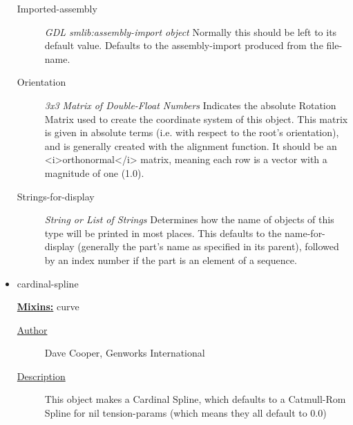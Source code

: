 \documentclass [11pt]{book}
\begin{document}
\begin{itemize}
\begin{description}
\item [Imported-assembly]
\emph{GDL smlib:assembly-import object} Normally this should be left to its default value.
Defaults to the assembly-import produced from the file-name.


\item [Orientation]
\emph{3x3 Matrix of Double-Float Numbers} Indicates the absolute Rotation Matrix used to create
the coordinate system of this object. This matrix is given in absolute terms (i.e. with
respect to the root's orientation), and is generally created with the alignment function.
It should be an <i>orthonormal</i> matrix, meaning each row is a vector with a magnitude
of one (1.0).


\item [Strings-for-display]
\emph{String or List of Strings} Determines how the name of objects of this type will be printed in most places.
This defaults to the name-for-display (generally the part's name as specified in its
parent), followed by an index number if the part is an element of a sequence.


\end{description}







\item {}cardinal-spline


\textbf{
\underline{Mixins:}} curve





\begin{description}

\item [
\underline{Author}]


Dave Cooper, Genworks International



\item [
\underline{Description}]


This object makes a Cardinal Spline, which defaults to a Catmull-Rom Spline for nil tension-params (which means they all default to 0.0)



\end{description}










\end{itemize}
\end{document}
